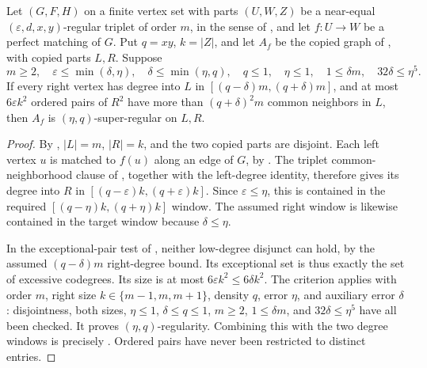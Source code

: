 \begin{lemma}
Let $(G,F,H)$ on a finite vertex set with parts $(U,W,Z)$ be a near-equal
$(\varepsilon,d,x,y)$-regular triplet of order $m$, in the sense of
, and let $f:U\to W$ be a perfect
matching of $G$. Put $q=xy$, $k=|Z|$, and let $A_f$ be the copied graph
of , with copied parts $L,R$.
Suppose
\[
 m\geq2,\quad \varepsilon\leq\min(\delta,\eta),\quad
 \delta\leq\min(\eta,q),\quad q\leq1,\quad\eta\leq1,\quad
 1\leq\delta m,\quad32\delta\leq\eta^5.
\]
If every right vertex has degree into $L$ in
$[(q-\delta)m,(q+\delta)m]$, and at most $6\varepsilon k^2$
ordered pairs of $R^2$ have more than $(q+\delta)^2m$ common neighbors
in $L$, then $A_f$ is $(\eta,q)$-super-regular on $L,R$.
\end{lemma}
\begin{proof}
By , $|L|=m$, $|R|=k$, and
the two copied parts are disjoint. Each left vertex $u$ is matched to
$f(u)$ along an edge of $G$, by .
The triplet common-neighborhood clause of
, together with the left-degree identity,
therefore gives its degree into $R$ in $[(q-\varepsilon)k,
(q+\varepsilon)k]$. Since $\varepsilon\leq\eta$, this is contained
in the required $[(q-\eta)k,(q+\eta)k]$ window. The assumed right
window is likewise contained in the target window because $\delta\leq\eta$.

In the exceptional-pair test of
, neither low-degree
disjunct can hold, by the assumed $(q-\delta)m$ right-degree bound.
Its exceptional set is thus exactly the set of excessive codegrees.
Its size is at most $6\varepsilon k^2\leq6\delta k^2$.
The criterion applies with order $m$, right size $k\in\{m-1,m,m+1\}$,
density $q$, error $\eta$, and auxiliary error $\delta$: disjointness,
both sizes, $\eta\leq1$, $\delta\leq q\leq1$, $m\geq2$,
$1\leq\delta m$, and $32\delta\leq\eta^5$ have all been checked.
It proves $(\eta,q)$-regularity. Combining this with the two degree
windows is precisely . Ordered pairs have
never been restricted to distinct entries.
\end{proof}
